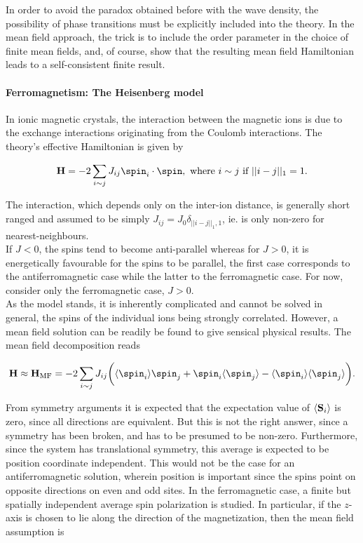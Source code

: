 In order to avoid the paradox obtained before with the wave density, the possibility of phase transitions must be explicitly included into the theory. In the mean field approach, the trick is to include the order parameter in the choice of finite mean fields, and, of course, show that the resulting mean field Hamiltonian leads to a self-consistent finite result. \\

\paragraph{\textbf{Ferromagnetism: The Heisenberg model}}

In ionic magnetic crystals, the interaction between the magnetic ions is due to the exchange interactions originating from the Coulomb interactions. The theory's effective Hamiltonian is given by 

\begin{equation}
    {\bf H} = - 2 \sum_{i \sim j} J_{ij} {\spin}_i \cdot \spin, \textnormal{ where } i \sim j \textnormal{ if } ||i-j||_1 = 1.
\end{equation}

The interaction, which depends only on the inter-ion distance, is generally short ranged and assumed to be simply $J_{ij} = J_0 \delta_{||i-j||_1, 1}$, ie. is only non-zero for nearest-neighbours. \\

If $J<0$, the spins tend to become anti-parallel whereas for $J>0$, it is energetically favourable for the spins to be parallel, the first case corresponds to the antiferromagnetic case while the latter to the ferromagnetic case. For now, consider only the ferromagnetic case, $J > 0$. \\

As the model stands, it is inherently complicated and cannot be solved in general, the spins of the individual ions being strongly correlated. However, a mean field solution can be readily be found to give sensical physical results. The mean field decomposition reads

\begin{equation}
    {\bf H} \approx {\bf H}_{\textnormal{MF}} = -2 \sum_{i \sim j} J_{ij} \bigg( \langle \spin_i \rangle \spin_j + \spin_i\langle \spin_j \rangle - \langle \spin_i \rangle \langle \spin_j \rangle \bigg).
\end{equation}

From symmetry arguments it is expected that the expectation value of $\langle {\bf S}_i \rangle$ is zero, since all directions are equivalent. But this is not the right answer, since a symmetry has been broken, and has to be presumed to be non-zero. Furthermore, since the system has translational symmetry, this average is expected to be position coordinate independent. This would not be the case for an antiferromagnetic solution, wherein position is important since the spins point on opposite directions on even and odd sites. In the ferromagnetic case, a finite but spatially independent average spin polarization is studied. In particular, if the $z$-axis is chosen to lie along the direction of the magnetization, then the mean field assumption is

